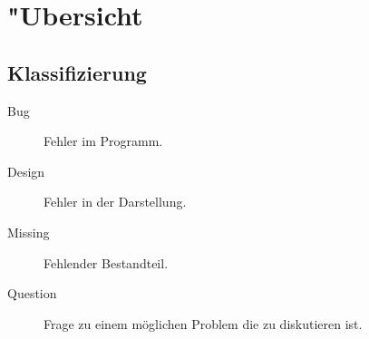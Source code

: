 %



\section{{"U}bersicht}
\label{Kapitel:Programmfehler:Uebersicht}








\subsection{Klassifizierung}
\label{Abschnitt:Programmfehler:Uebersicht:Klassifizierung}



\begin{description}

	\item[Bug] Fehler im Programm.
	
	\item[Design] Fehler in der Darstellung.
	
	\item[Missing] Fehlender Bestandteil.
	
	\item[Question] Frage zu einem möglichen Problem die zu diskutieren ist.

\end{description}





